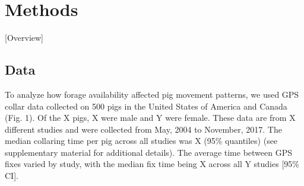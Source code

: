 \documentclass[a4paper]{article}
\begin{document}





\section*{Methods}

[Overview]

\subsection*{Data}

To analyze how forage availability affected pig movement patterns, we used GPS collar data collected on 500 pigs in the United States of America and Canada (Fig. 1).  Of the X pigs, X were male and Y were female. These data are from X different studies and were collected from May, 2004 to November, 2017.  The median collaring time per pig across all studies was X (95\% quantiles) (see supplementary material for additional details). The average time between GPS fixes varied by study, with the median fix time being X across all Y studies [95\% CI]. 
\end{document}
